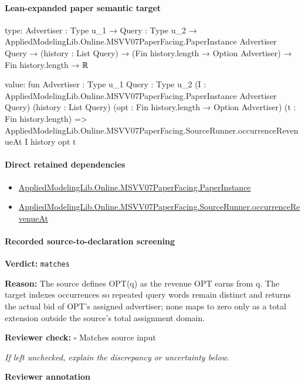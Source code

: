 \documentclass[10pt]{article}
\newcommand{\reviewerbox}{%
  \par\noindent\fbox{\parbox{0.96\linewidth}{\rule{0pt}{0.38in}}}\par
}
\newcommand{\reviewmatch}[1]{%
  \par\noindent\textbf{Reviewer check:} $\square$\; #1\par
  \noindent\emph{If left unchecked, explain the discrepancy or uncertainty below.}\par
}
\begin{document}
\paragraph{Lean-expanded paper semantic target}
\begin{ReviewVerbatim}
type:
{Advertiser : Type u_1} →
  {Query : Type u_2} →
    AppliedModelingLib.Online.MSVV07PaperFacing.PaperInstance Advertiser Query →
      (history : List Query) → (Fin history.length → Option Advertiser) → Fin history.length → ℝ

value:
fun {Advertiser : Type u_1} {Query : Type u_2}
    (I : AppliedModelingLib.Online.MSVV07PaperFacing.PaperInstance Advertiser Query) (history : List Query)
    (opt : Fin history.length → Option Advertiser) (t : Fin history.length) =>
  AppliedModelingLib.Online.MSVV07PaperFacing.SourceRunner.occurrenceRevenueAt I history opt t
\end{ReviewVerbatim}

\paragraph{Direct retained dependencies}
\begin{itemize}\raggedright
\item \hyperlink{governing-declaration-11907576ec71eeb5}{Applied\allowbreak{}Modeling\allowbreak{}Lib.\allowbreak{}Online.\allowbreak{}MSVV07\allowbreak{}Paper\allowbreak{}Facing.\allowbreak{}Paper\allowbreak{}Instance}
\item \hyperlink{governing-declaration-e5910b4eff26b2fc}{Applied\allowbreak{}Modeling\allowbreak{}Lib.\allowbreak{}Online.\allowbreak{}MSVV07\allowbreak{}Paper\allowbreak{}Facing.\allowbreak{}Source\allowbreak{}Runner.\allowbreak{}occurrence\allowbreak{}Revenue\allowbreak{}At}
\end{itemize}
\paragraph{Recorded source-to-declaration screening}
\textbf{Verdict:} \texttt{matches}
\\
{\raggedright
\textbf{Reason:} The source defines OPT(q) as the revenue OPT earns from q.\allowbreak{} The target indexes occurrences so repeated query words remain distinct and returns the actual bid of OPT's assigned advertiser;\allowbreak{} none maps to zero only as a total extension outside the source's total assignment domain.\allowbreak{}
\par}
\reviewmatch{Matches source input}
\noindent\textbf{Reviewer annotation}\par
\reviewerbox
\clearpage
\hypertarget{paper-prerequisite-721f252b2952e397}{}
\end{document}
